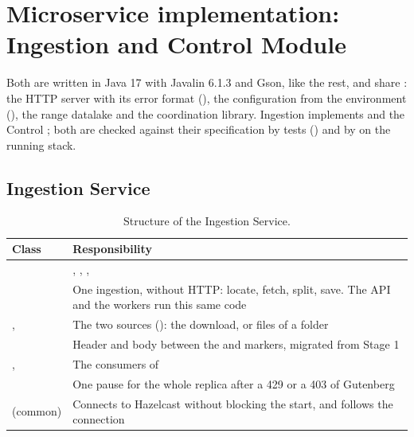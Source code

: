 \section{Microservice implementation: Ingestion and Control Module}
\label{sec:ingestion-control}

Both are written in Java 17 with Javalin 6.1.3 and Gson, like the rest, and share : the HTTP server
with its error format (), the configuration from the environment (), the range datalake
and the coordination library. Ingestion implements  and the Control
; both are checked against their specification by tests ()
and by  on the running stack.

\subsection{Ingestion Service}

\begin{table}[H]
\centering\small
\begin{tabularx}{\linewidth}{@{}L{4.1cm}X@{}}
\toprule
\textbf{Class} & \textbf{Responsibility} \\
\midrule
{} & , , ,  \\
 & One ingestion, without HTTP: locate, fetch, split, save. The API and the workers run this same code \\
,  & The two sources (): the download, or  files of a folder \\
 & Header and body between the  and  markers, migrated from Stage 1 \\
,  & The  consumers of  \\
 & One pause for the whole replica after a 429 or a 403 of Gutenberg \\
 (common) & Connects to Hazelcast without blocking the start, and follows the connection \\
\bottomrule
\end{tabularx}
\caption{Structure of the Ingestion Service.}
\end{table}

